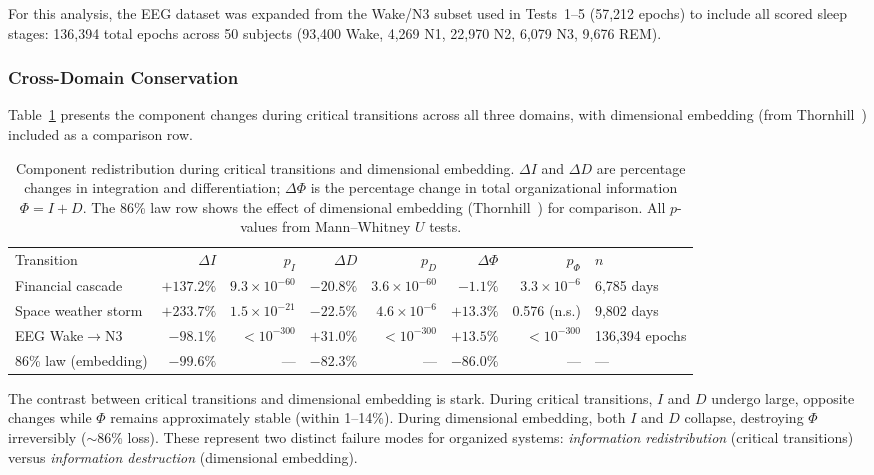 \documentclass[aip,cha,reprint,amsmath,amssymb,final,floatfix]{revtex4-2}
\begin{document}
For this analysis, the EEG dataset was expanded from the Wake/N3 subset used in Tests~1--5 (57,212 epochs) to include all scored sleep stages: 136,394 total epochs across 50 subjects (93,400 Wake, 4,269 N1, 22,970 N2, 6,079 N3, 9,676 REM).

\subsubsection{Cross-Domain Conservation}

Table~\ref{tab:conservation} presents the component changes during critical transitions across all three domains, with dimensional embedding (from Thornhill~\cite{thornhill2026b,thornhill2026c}) included as a comparison row.

\begin{table}
\caption[Cross-domain comparison of component changes during critical transitions]{\label{tab:conservation}Component redistribution during critical transitions and dimensional embedding. $\Delta I$ and $\Delta D$ are percentage changes in integration and differentiation; $\Delta\Phi$ is the percentage change in total organizational information $\Phi = I + D$. The 86\% law row shows the effect of dimensional embedding (Thornhill~\cite{thornhill2026b,thornhill2026c}) for comparison. All $p$-values from Mann--Whitney $U$ tests.}
\begin{ruledtabular}
\begin{tabular}{lrrrrrrl}
Transition & $\Delta I$ & $p_I$ & $\Delta D$ & $p_D$ & $\Delta\Phi$ & $p_\Phi$ & $n$ \\
Financial cascade & $+137.2\%$ & $9.3 \times 10^{-60}$ & $-20.8\%$ & $3.6 \times 10^{-60}$ & $-1.1\%$ & $3.3 \times 10^{-6}$ & 6{,}785 days \\
Space weather storm & $+233.7\%$ & $1.5 \times 10^{-21}$ & $-22.5\%$ & $4.6 \times 10^{-6}$ & $+13.3\%$ & 0.576 (n.s.) & 9{,}802 days \\
EEG Wake$\to$N3 & $-98.1\%$ & $< 10^{-300}$ & $+31.0\%$ & $< 10^{-300}$ & $+13.5\%$ & $< 10^{-300}$ & 136{,}394 epochs \\
86\% law (embedding) & $-99.6\%$ & --- & $-82.3\%$ & --- & $-86.0\%$ & --- & --- \\
\end{tabular}
\end{ruledtabular}
\end{table}

The contrast between critical transitions and dimensional embedding is stark. During critical transitions, $I$ and $D$ undergo large, opposite changes while $\Phi$ remains approximately stable (within 1--14\%). During dimensional embedding, both $I$ and $D$ collapse, destroying $\Phi$ irreversibly (${\sim}86$\% loss). These represent two distinct failure modes for organized systems: \emph{information redistribution} (critical transitions) versus \emph{information destruction} (dimensional embedding).
\end{document}
